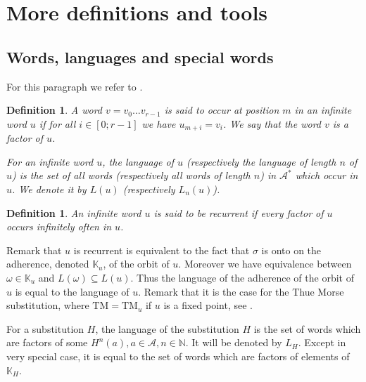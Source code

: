 \documentclass[11 pt]{article}
\newtheorem{definition}[proposition]{Definition}
\def\K{{\mathbb K}}
\theoremstyle{definition}
\begin{document}
\section{More definitions and tools}\label{sec-substi}

\subsection{Words, languages and special words}

For this paragraph we refer to \cite{Pyth.02}.


\begin{definition}
A word $v=v_0\dots v_{r-1}$ is said to occur at position $m$ in an infinite word $u$ if for all $i\in[0;r-1]$ we have $u_{m+i}=v_i$. We say that the word $v$ is a \emph{factor} of $u$. 

For an infinite word $u$, the language of $u$ (respectively the language of length $n$ of $u$)  is the set of all words (respectively all words of length $n$) in $\mathcal{A}^*$ which occur in $u$. We denote it by $L(u)$ (respectively $L_{n}(u)$). 
 

\end{definition}


\begin{definition}\label{def-rec-lin} 
An infinite word $u$ is said to be recurrent if every factor of $u$ occurs infinitely often in $u$. 

\end{definition}


Remark that $u$ is recurrent is equivalent to the fact that $\sigma$ is onto on the adherence, denoted $\K_u$, of the orbit of $u$. Moreover we have equivalence between $\omega\in \mathbb K_u$ and $L(\omega)\subseteq L(u)$. Thus the language of the adherence of the orbit of $u$ is equal to the language of $u$. 
Remark that it is the case for the Thue Morse substitution, where $\mathrm{TM}=\mathrm{TM}_u$ if $u$ is a fixed point, see \cite{Pyth.02}.

For a substitution $H$, the language of the substitution $H$ is the set of words which are factors of some $H^n(a), a\in\mathcal{A}, n\in\mathbb N$. It will be denoted by $L_{H}$. Except in very special case, it is equal to the set of words which are factors of elements of $\K_H$.
\end{document}
